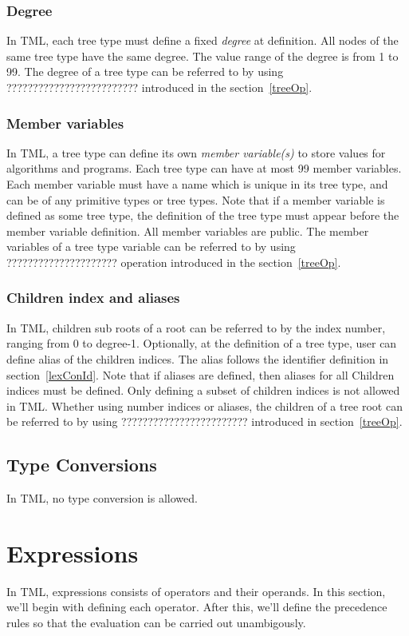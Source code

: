 \documentclass[12pt,psfig,a4]{article}
\begin{document}
\subsubsection {Degree}
In TML, each tree type must define a fixed \textit{degree} at definition. All nodes of the same tree type have the same degree. The value range of the degree is from 1 to 99. The degree of a tree type can be referred to by using  ????????????????????????? introduced in the section~\ref{treeOp}.

\subsubsection {Member variables}
In TML, a tree type can define its own \textit{member variable(s)} to store values for algorithms and programs. Each tree type can have at most 99 member variables. Each member variable must have a name which is unique in its tree type, and can be of any primitive types or tree types. Note that if a member variable is defined as some tree type, the definition of the tree type must appear before the member variable definition. All member variables are public. The member variables of a tree type variable can be referred to by using  ????????????????????? operation introduced in the section~\ref{treeOp}.

\subsubsection {Children index and aliases}
In TML, children sub roots of a root can be referred to by the index number, ranging from 0 to degree-1. Optionally, at the definition of a tree type, user can define alias of the children indices. The alias follows the identifier definition in section~\ref{lexConId}. Note that if aliases are defined, then aliases for all Children indices must be defined. Only defining a subset of children indices is not allowed in TML. Whether using number indices or aliases, the children of a tree root can be referred to by using ???????????????????????? introduced in section~\ref{treeOp}.

\subsection {Type Conversions}
In TML, no type conversion is allowed.


\section{Expressions}
In TML, expressions consists of operators and their operands. In this section, we'll begin with defining each operator. After this, we'll define the precedence rules so that the evaluation can be carried out unambigously.
\end{document}
